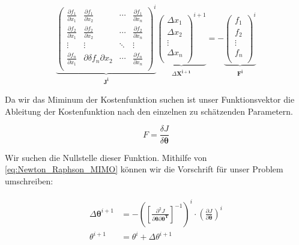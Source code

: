  \begin{equation}
	\underbrace{\begin{pmatrix}
	\frac{\partial f_{1}}{\partial x_{1}} & \frac{\partial f_{1}}{\partial x_{2}} & \cdots & \frac{\partial f_{1}}    		
	{\partial x_{n}}\\
	\frac{\partial f_{2}}{\partial x_{1}} & \frac{\partial f_{2}}{\partial x_{2}} & \cdots & \frac{\partial f_{2}}			
	{\partial x_{n}}\\
	\vdots & \vdots & \ddots & \vdots\\
	\frac{\partial f_{n}}{\partial x_{1}} & \partial{\delta f_{n}}{\partial x_{2}} & \cdots & \frac{\partial f_{n}}			
	{\partial x_{n}}\\
	\end{pmatrix}^{i}}_{\substack{\mathbf{J^{i}}}}
	\underbrace{\begin{pmatrix}
	\Delta x_{1}\\
	\Delta x_{2}\\
	\vdots\\
	\Delta x_{n}\\
	\end{pmatrix}^{i+1}}_{\substack{\Delta \mathbf{X^{i+1}}}} = -
	\underbrace{\begin{pmatrix}
	f_{1}\\
	f_{2}\\
	\vdots\\
	f_{n}\\
	\end{pmatrix}^{i}}_{\substack{\mathbf{F^{i}}}}
	\label{eq:Newton_Raphson_MIMO}
\end{equation} 

Da wir das Miminum der Kostenfunktion suchen ist unser Funktionsvektor die Ableitung der Kostenfunktion nach den einzelnen zu schätzenden Parametern. 

\begin{equation}
	{F} = \frac{\delta J}{\delta \mathbf{\theta}}
	\label{eq:Newton_Raphson_1}
\end{equation}

Wir suchen die Nullstelle dieser Funktion. Mithilfe von \cref{eq:Newton_Raphson_MIMO} können wir die Vorschrift für 
unser Problem umschreiben:

\begin{align}
	\begin{split}
		\Delta \mathbf{\theta}^{i+1} &= -\left(\left[  \frac{\partial^{2}J}{\partial \mathbf{\theta} \partial 
		\mathbf{\theta^T}}\right]^{-1} \right)^{i} \cdot \left(\frac{\partial J}{\partial \mathbf{\theta}}\right)^{i} \\
		\theta^{i+1} &= \theta^{i} + \Delta\theta^{i+1}
		\label{eq:Newton_Raphson_2}
	\end{split}
\end{align}

